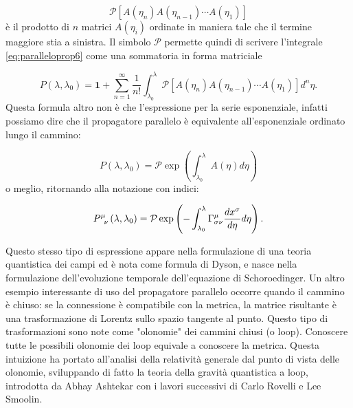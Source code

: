 \documentclass[twoside]{article}
\begin{document}
\begin{equation}
	\mathcal{P}[A(\eta_n) A(\eta_{n-1}) \cdots A(\eta_1)]
\end{equation}
è il prodotto di $n$ matrici $A(\eta_i)$ ordinate in maniera tale che il termine maggiore stia a sinistra. Il simbolo $\mathcal{P}$ permette quindi di scrivere l'integrale \ref{eq:paralleloprop6} come una sommatoria in forma matriciale 

\begin{equation}
	P(\lambda,\lambda_0) = \mathbf{1} + \sum_{n=1}^{\infty}
	 \frac{1}{n!}\int_{\lambda_0}^{\lambda}\mathcal{P}[A(\eta_n)
		A(\eta_{n-1})\cdots A(\eta_1)] d^n \eta .
\end{equation}
 Questa formula altro non è che l'espressione per la serie esponenziale, infatti possiamo dire che il propagatore parallelo è equivalente all'esponenziale ordinato lungo il cammino:

\begin{equation}
	P(\lambda,\lambda_0) = \mathcal{P}\exp \left( \int_{\lambda_0}^{\lambda} A(\eta)d\eta \right)
\end{equation}
o meglio, ritornando alla notazione con indici:

\begin{equation}
P\indices{^\mu_\nu}(\lambda,\lambda_0) = \mathcal{P}\exp \left( - \int_{\lambda_0}^{\lambda} \Gamma_{\sigma \nu}^{\mu} \frac{dx^\sigma}{d\eta}d\eta \right).
\end{equation}

Questo stesso tipo di espressione appare nella formulazione di una teoria  quantistica dei campi ed è nota come formula di Dyson, e nasce nella formulazione dell'evoluzione temporale dell'equazione di Schoroedinger. Un altro esempio interessante di uso del propagatore parallelo occorre quando il cammino è chiuso: se la connessione è compatibile con la metrica, la matrice risultante è una trasformazione di Lorentz sullo spazio tangente al punto. Questo tipo di trasformazioni sono note come "olonomie" dei cammini chiusi (o loop). Conoscere tutte le possibili olonomie dei loop equivale a conoscere la metrica. Questa intuizione ha portato all'analisi della relatività generale dal punto di vista delle olonomie, sviluppando di fatto la teoria della gravità quantistica a loop, introdotta da Abhay Ashtekar con i lavori successivi di  Carlo Rovelli e Lee Smoolin.
\end{document}
